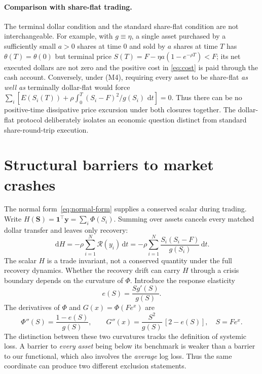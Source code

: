 \documentclass[11pt]{article}
\numberwithin{equation}{section}
\theoremstyle{definition}
\theoremstyle{remark}
\newcommand{\dd}{\,\mathrm{d}}
\newcommand{\one}{\mathbf{1}}
\begin{document}
\paragraph{Comparison with share-flat trading.}
The terminal dollar condition and the standard share-flat condition are not interchangeable. For example, with $g\equiv\eta$, a single asset purchased by a sufficiently small $a>0$ shares at time $0$ and sold by $a$ shares at time $T$ has $\theta(T)=\theta(0)$ but terminal price $S(T)=F-\eta a(1-e^{-\rho T})<F$; its net executed dollars are not zero and the positive cost in \eqref{eq:cost} is paid through the cash account. Conversely, under (M4), requiring every asset to be share-flat \emph{as well as} terminally dollar-flat would force $\sum_i[E(S_i(T))+\rho\int_0^T(S_i-F)^2/g(S_i)\,\dd t]=0$. Thus there can be no positive-time dissipative price excursion under both closures together. The dollar-flat protocol deliberately isolates an economic question distinct from standard share-round-trip execution.

\section{Structural barriers to market crashes}\label{sec:barriers}
The normal form~\eqref{eq:normal-form} supplies a conserved scalar during trading. Write $H(\bm S)=\one^\top\bm y=\sum_i\Phi(S_i)$. Summing over assets cancels every matched dollar transfer and leaves only recovery:
\begin{equation}\label{eq:potential-law}
\boxed{\dd H=-\rho\sum_{i=1}^N\mathcal R(y_i)\dd t
=-\rho\sum_{i=1}^N\frac{S_i(S_i-F)}{g(S_i)}\dd t.}
\end{equation}
The scalar $H$ is a trade invariant, not a conserved quantity under the full recovery dynamics. Whether the recovery drift can carry $H$ through a crisis boundary depends on the curvature of $\Phi$.
Introduce the response elasticity
\begin{equation}\label{eq:elasticity}
e(S)=\frac{Sg'(S)}{g(S)}.
\end{equation}
The derivatives of $\Phi$ and $G(x)=\Phi(Fe^x)$ are
\begin{equation}\label{eq:curvature}
\Phi''(S)=\frac{1-e(S)}{g(S)},\qquad
G''(x)=\frac{S^2}{g(S)}\,[2-e(S)],\quad S=Fe^x.
\end{equation}
The distinction between these two curvatures tracks the definition of systemic loss. A barrier to \emph{every asset} being below its benchmark is weaker than a barrier to our functional, which also involves the \emph{average} log loss. Thus the same coordinate can produce two different exclusion statements.
\end{document}
